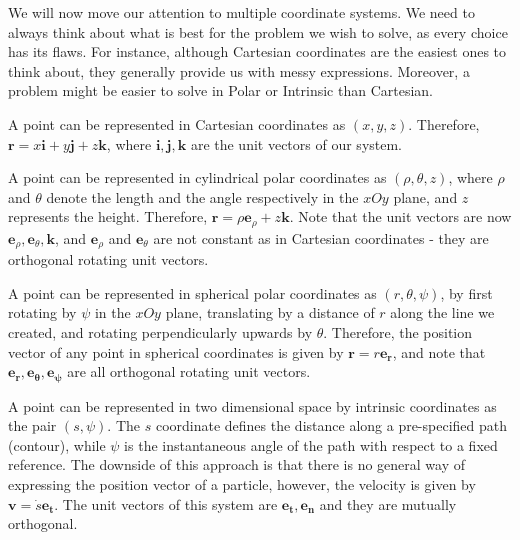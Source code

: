\documentclass[12pt]{article}
\begin{document}
We will now move our attention to multiple coordinate systems. We need to always think about what is best for the problem we wish to solve, as every choice has its flaws. For instance, although Cartesian coordinates are the easiest ones to think about, they generally provide us with messy expressions. Moreover, a problem might be easier to solve in Polar or Intrinsic than Cartesian.

\begin{definition}
    A point can be represented in Cartesian coordinates as $(x, y, z)$. Therefore, $\mathbf{r} = x\mathbf{i} + y\mathbf{j} + z\mathbf{k}$, where $\mathbf{i, j, k}$ are the unit vectors of our system.
\end{definition}

\begin{definition}
A point can be represented in cylindrical polar coordinates as $(\rho, \theta, z)$, where $\rho$ and $\theta$ denote the length and the angle respectively in the $xOy$ plane, and $z$ represents the height. Therefore, $\mathbf{r} = \rho \mathbf{e}_{\rho} + z \mathbf{k}$. Note that the unit vectors are now $\mathbf{e}_{\rho}, \mathbf{e}_{\theta}, \mathbf{k}$, and $\mathbf{e}_{\rho}$ and $\mathbf{e}_{\theta}$ are not constant as in Cartesian coordinates - they are orthogonal rotating unit vectors.
\end{definition}

\begin{definition}
    A point can be represented in spherical polar coordinates as $(r, \theta, \psi)$, by first rotating by $\psi$ in the $xOy$ plane, translating by a distance of $r$ along the line we created, and rotating perpendicularly upwards by $\theta$. Therefore, the position vector of any point in spherical coordinates is given by $\mathbf{r} = r\mathbf{e_r}$, and note that $\mathbf{e_r, e_{\theta}, e_{\psi}}$ are all orthogonal rotating unit vectors.
\end{definition}

\begin{definition}
    A point can be represented in two dimensional space by intrinsic coordinates as the pair $(s, \psi)$. The $s$ coordinate defines the distance along a pre-specified path (contour), while $\psi$ is the instantaneous angle of the path with respect to a fixed reference. The downside of this approach is that there is no general way of expressing the position vector of a particle, however, the velocity is given by $\mathbf{v} = \dot{s}\mathbf{e_t}$. The unit vectors of this system are $\mathbf{e_t, e_n}$ and they are mutually orthogonal.
\end{definition}
\end{document}
